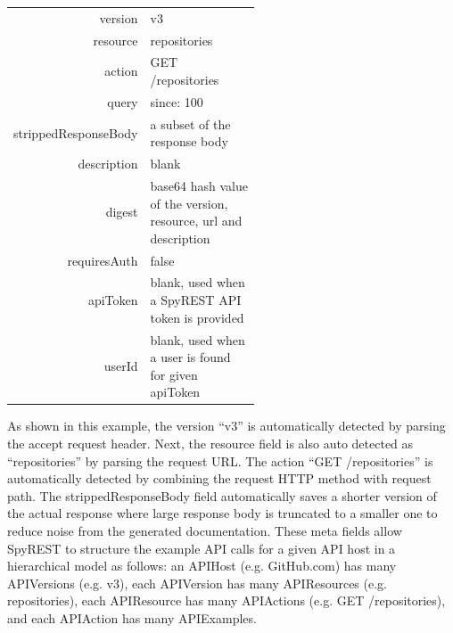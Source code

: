 \documentclass[conference]{IEEEtran}
\begin{document}
\footnotesize
\begin{tabular}{r p{0.55\linewidth}}
  version & v3 \\
  resource & repositories \\
  action & GET /repositories \\
  query & since: 100 \\
  strippedResponseBody & a subset of the response body \\
  description & blank \\
  digest & base64 hash value of the version, resource, url and description \\
  requiresAuth & false \\
  apiToken & blank, used when a SpyREST API token is provided \\
  userId & blank, used when a user is found for given apiToken \\
\end{tabular}
\normalsize

As shown in this example, the version ``v3'' is automatically detected by parsing the accept request header. Next, the resource field is also auto detected as ``repositories'' by parsing the request URL. The action ``GET /repositories'' is automatically detected by combining the request HTTP method with request path. The strippedResponseBody field automatically saves a shorter version of the actual response where large response body is truncated to a smaller one to reduce noise from the generated documentation. These meta fields allow SpyREST to structure the example API calls for a given API host in a hierarchical model as follows: an APIHost (e.g. GitHub.com) has many APIVersions (e.g. v3), each APIVersion has many APIResources (e.g. repositories), each APIResource has many APIActions (e.g. GET /repositories), and each APIAction has many APIExamples.
\end{document}
